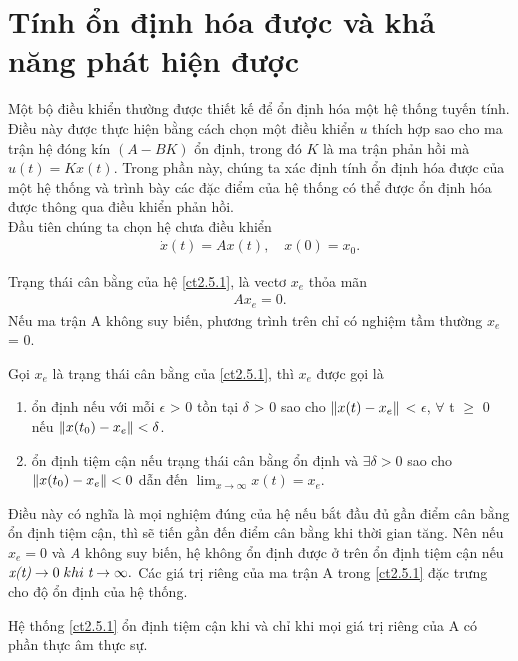 \section{Tính ổn định hóa được và khả năng phát hiện được}
Một bộ điều khiển thường được thiết kế để ổn định hóa một hệ thống tuyến tính. Điều này được thực hiện bằng cách chọn một điều khiển $u$ thích hợp sao cho ma trận hệ đóng kín $(A - BK)$ ổn định, trong đó $K$ là ma trận phản hồi mà $u(t) = Kx(t)$. Trong phần này, chúng ta xác định tính ổn định hóa được của một hệ thống và trình bày các đặc điểm của hệ thống có thể được ổn định hóa được thông qua điều khiển phản hồi.\\
Đầu tiên chúng ta chọn hệ chưa điều khiển
\begin{align}\label{ct2.5.1}
    \dot{x}(t) = Ax(t), \quad x(0) = x_0.
\end{align}
\begin{definition}
Trạng thái cân bằng của hệ \eqref{ct2.5.1}, là vectơ $x_e$ thỏa mãn
\begin{align}
    Ax_e = 0.
\end{align}
Nếu ma trận A không suy biến, phương trình trên chỉ có nghiệm tầm thường $x_e$ = 0.
\end{definition}
\begin{definition}
Gọi $x_e$ là trạng thái cân bằng của \eqref{ct2.5.1}, thì $x_e$ được gọi là
\begin{enumerate}
    \item ổn định nếu với mỗi $\epsilon$ > 0 tồn tại $\delta$ > 0  sao cho $\norm{x(t) - x_e}$ < $\epsilon$,  $\forall$ t $\geq$ 0 nếu $\norm{x(t_0) - x_e} < \delta$.
    \item ổn định tiệm cận nếu trạng thái cân bằng ổn định và $\exists \delta > 0$ sao cho $\norm{x(t_0) - x_e} < 0$ dẫn đến $\displaystyle \lim_{x\to\infty} x(t) = x_e$.
\end{enumerate}
\end{definition}
Điều này có nghĩa là mọi nghiệm đúng của hệ nếu bắt đầu đủ gần điểm cân bằng ổn định tiệm cận, thì sẽ tiến gần đến điểm cân bằng khi thời gian tăng. Nên nếu $x_e = 0$ và \emph{A} không suy biến, hệ không ổn định được ở trên ổn định tiệm cận nếu $\emph{x(t)} \to 0 \; khi \; \emph{t} \to \infty.$
Các giá trị riêng của ma trận A trong \eqref{ct2.5.1} đặc trưng cho độ ổn định của hệ thống.
\begin{theorem}
Hệ thống \eqref{ct2.5.1} ổn định tiệm cận khi và chỉ khi mọi giá trị riêng của A có phần thực âm thực sự.
\end{theorem}
